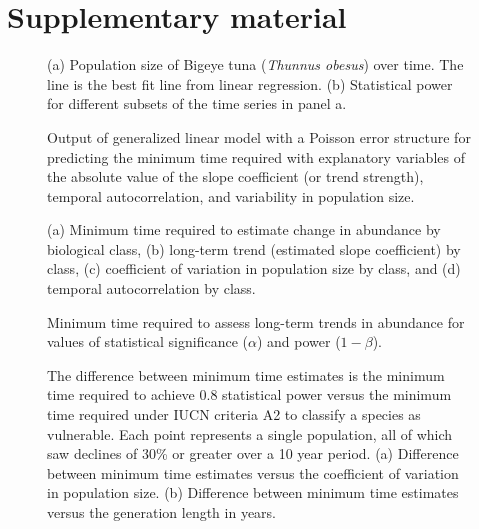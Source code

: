 \documentclass[12pt,]{article}
\begin{document}
\clearpage

\section{Supplementary material}\label{supplementary-material}

\setcounter{figure}{0} \renewcommand{\thefigure}{A\arabic{figure}}

\begin{figure}[htbp]
\centering
\caption{(a) Population size of Bigeye tuna (\emph{Thunnus obesus}) over
time. The line is the best fit line from linear regression. (b)
Statistical power for different subsets of the time series in panel
a.\label{fig:empirical_approach_example}}
\end{figure}

\begin{figure}[htbp]
\centering
\caption{Output of generalized linear model with a Poisson error
structure for predicting the minimum time required with explanatory
variables of the absolute value of the slope coefficient (or trend
strength), temporal autocorrelation, and variability in population
size.\label{fig:poisson_model}}
\end{figure}

\begin{figure}[htbp]
\centering
\caption{(a) Minimum time required to estimate change in abundance by biological class, (b) long-term trend (estimated slope coefficient) by class, (c) coefficient of variation in population size by class, and (d) temporal autocorrelation by class.\label{fig:class}}
\end{figure}

\begin{figure}[htbp]
\centering
\caption{Minimum time required to assess long-term trends in abundance
for values of statistical significance (\(\alpha\)) and power
(\(1-\beta\)).\label{fig:min_time_vs_alpha_beta}}
\end{figure}

\begin{figure}[htbp]
\centering
\caption{The difference between minimum time estimates is the minimum time required to achieve 0.8 statistical power versus the minimum time required under IUCN criteria A2 to classify a species as vulnerable. Each point represents a single population, all of which saw declines of 30\% or greater over a 10 year period. (a) Difference between minimum time estimates versus the coefficient of variation in population size. (b) Difference between minimum time estimates versus the generation length in years.\label{fig:IUCN_correlates}}
\end{figure}
\end{document}
